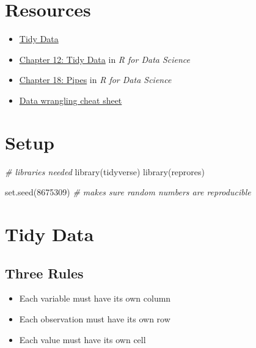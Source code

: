 \documentclass[
  oneside]{book}
\newenvironment{Shaded}{\begin{snugshade}}{\end{snugshade}}
\newcommand{\CommentTok}[1]{\textcolor[rgb]{0.56,0.35,0.01}{\textit{#1}}}
\newcommand{\DecValTok}[1]{\textcolor[rgb]{0.00,0.00,0.81}{#1}}
\newcommand{\FunctionTok}[1]{\textcolor[rgb]{0.00,0.00,0.00}{#1}}
\newcommand{\NormalTok}[1]{#1}
\providecommand{\tightlist}{%
  \setlength{\itemsep}{0pt}\setlength{\parskip}{0pt}}
\begin{document}
\hypertarget{resources-tidyr}{%
\section{Resources}\label{resources-tidyr}}

\begin{itemize}
\tightlist
\item
  \href{http://vita.had.co.nz/papers/tidy-data.html}{Tidy Data}
\item
  \href{http://r4ds.had.co.nz/tidy-data.html}{Chapter 12: Tidy Data} in \emph{R for Data Science}
\item
  \href{http://r4ds.had.co.nz/pipes.html}{Chapter 18: Pipes} in \emph{R for Data Science}
\item
  \href{https://www.rstudio.com/wp-content/uploads/2015/02/data-wrangling-cheatsheet.pdf}{Data wrangling cheat sheet}
\end{itemize}

\hypertarget{setup-tidyr}{%
\section{Setup}\label{setup-tidyr}}

\begin{Shaded}
\begin{Highlighting}[]
\CommentTok{\# libraries needed}
\FunctionTok{library}\NormalTok{(tidyverse)}
\FunctionTok{library}\NormalTok{(reprores)}

\FunctionTok{set.seed}\NormalTok{(}\DecValTok{8675309}\NormalTok{) }\CommentTok{\# makes sure random numbers are reproducible}
\end{Highlighting}
\end{Shaded}

\hypertarget{tidy-data}{%
\section{Tidy Data}\label{tidy-data}}

\hypertarget{three-rules}{%
\subsection{Three Rules}\label{three-rules}}

\begin{itemize}
\tightlist
\item
  Each variable must have its own column
\item
  Each observation must have its own row
\item
  Each value must have its own cell
\end{itemize}
\end{document}
